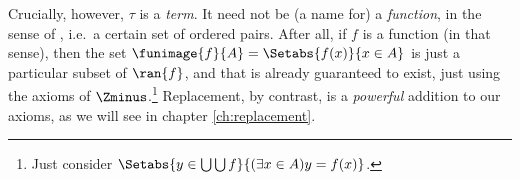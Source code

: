 \documentclass[../../../include/open-logic-section]{subfiles}
\begin{document}
Crucially, however, $\tau$ is a \emph{term}. It need not be (a name for) a \emph{function}, in the sense of , i.e.\ a certain set of ordered pairs. After all, if $f$ is a function (in that sense), then the set $\funimage{f}{A} = \Setabs{f(x)}{x \in A}$ is just a particular subset of $\ran{f}$, and that is already guaranteed to exist, just using the axioms of $\Zminus$.\footnote{Just consider $\Setabs{y \in \bigcup \bigcup f}{(\exists x \in A)y = f(x)}$.} Replacement, by contrast, is a \emph{powerful} addition to our axioms, as we will see in chapter \ref{ch:replacement}.
\end{document}
